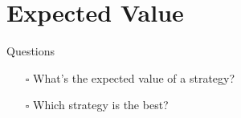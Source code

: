 \documentclass{beamer}
\begin{document}
\section{Expected Value}
  \begin{frame}{Questions}
  \begin{itemize}
    \item[$\square$] What's the expected value of a strategy?
    \item[$\square$] Which strategy is the best?
  \end{itemize}
  \end{frame}

\end{document}
